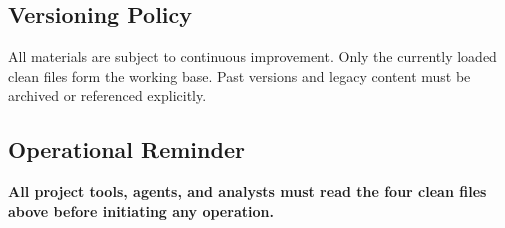 \documentclass[12pt]{article}
\begin{document}
\subsection*{Versioning Policy}

All materials are subject to continuous improvement. Only the currently loaded clean files form the working base. Past versions and legacy content must be archived or referenced explicitly.

\subsection*{Operational Reminder}

\textbf{All project tools, agents, and analysts must read the four clean files above before initiating any operation.}
\end{document}
